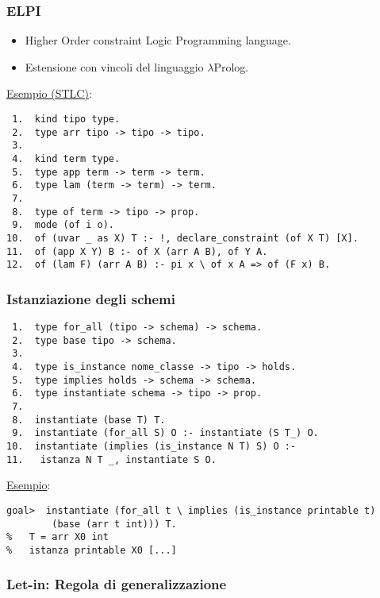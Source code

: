 \documentclass{beamer}
\begin{document}
\begin{frame}[fragile=singleslide]      %

 \frametitle{ELPI}

 \begin{itemize}
  \item Higher Order constraint Logic Programming language.
  \item Estensione con vincoli del linguaggio $\lambda$Prolog.
 \end{itemize}

 \vfill
 
 \underline{Esempio (STLC)}:
 \begin{verbatim}
 1.  kind tipo type.
 2.  type arr tipo -> tipo -> tipo.
 3.
 4.  kind term type.
 5.  type app term -> term -> term.
 6.  type lam (term -> term) -> term.
 7.
 8.  type of term -> tipo -> prop.
 9.  mode (of i o).
10.  of (uvar _ as X) T :- !, declare_constraint (of X T) [X].
11.  of (app X Y) B :- of X (arr A B), of Y A.
12.  of (lam F) (arr A B) :- pi x \ of x A => of (F x) B.
 \end{verbatim}

\end{frame}


\begin{frame}[fragile=singleslide]      %

 \frametitle{Istanziazione degli schemi}

 \begin{verbatim}
 1.  type for_all (tipo -> schema) -> schema.
 2.  type base tipo -> schema.
 3.
 4.  type is_instance nome_classe -> tipo -> holds.
 5.  type implies holds -> schema -> schema.
 6.  type instantiate schema -> tipo -> prop.
 7.
 8.  instantiate (base T) T.
 9.  instantiate (for_all S) O :- instantiate (S T_) O.
10.  instantiate (implies (is_instance N T) S) O :-
11.   istanza N T _, instantiate S O.
 \end{verbatim}

 \vfill

 \underline{Esempio}:
 \begin{verbatim}
goal>  instantiate (for_all t \ implies (is_instance printable t)
        (base (arr t int))) T.
%   T = arr X0 int
%   istanza printable X0 [...]
 \end{verbatim}


\end{frame}


\begin{frame}[fragile=singleslide]      %

 \frametitle{Let-in: Regola di generalizzazione}


\end{frame}
\end{document}
